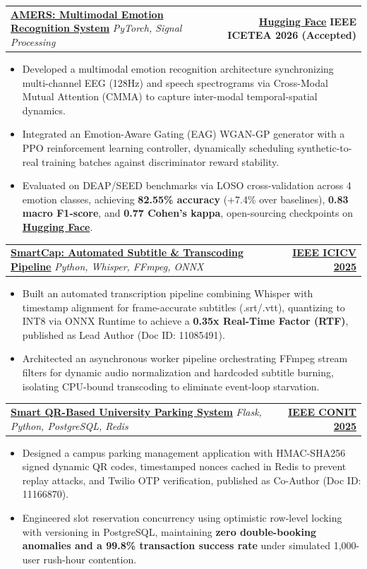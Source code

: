 \documentclass[letterpaper,10pt]{article}
\makeatletter
\newcommand{\resumeItem}[1]{
  \item\small{{\color{inkprimary}#1 \vspace{-1.5pt}}}
}
\newcommand{\resumeProjectHeading}[2]{
  \vspace{-3pt}\item
    \begin{tabular*}{\textwidth}{l@{\extracolsep{\fill}}r}
      \small\color{inkprimary}#1 & \small\color{inksecondary}#2 \\
    \end{tabular*}\vspace{-4.5pt}
}
\newcommand{\resumeItemListStart}{\begin{itemize}[leftmargin=0.14in, label={\color{inksecondary}\scriptsize$\bullet$}]}
\newcommand{\resumeItemListEnd}{\end{itemize}\vspace{-3.5pt}}
\makeatother
\begin{document}
    \resumeProjectHeading
      {\href{https://github.com/RAVINDRA8008/Adaptive-GAN-Augmented-EEG-Speech-Emotion-Recognition-via-Deep-Reinforcement-Learning}{\textbf{AMERS: Multimodal Emotion Recognition System}} \enspace\textbullet\enspace \emph{PyTorch, Signal Processing}}{\href{https://huggingface.co/r5avindra/amers-checkpoints}{\textbf{Hugging Face}} \enspace\textbullet\enspace \textbf{IEEE ICETEA 2026 (Accepted)}}
      \resumeItemListStart
        \resumeItem{Developed a multimodal emotion recognition architecture synchronizing multi-channel EEG (128Hz) and speech spectrograms via Cross-Modal Mutual Attention (CMMA) to capture inter-modal temporal-spatial dynamics.}
        \resumeItem{Integrated an Emotion-Aware Gating (EAG) WGAN-GP generator with a PPO reinforcement learning controller, dynamically scheduling synthetic-to-real training batches against discriminator reward stability.}
        \resumeItem{Evaluated on DEAP/SEED benchmarks via LOSO cross-validation across 4 emotion classes, achieving \textbf{82.55\% accuracy} (+7.4\% over baselines), \textbf{0.83 macro F1-score}, and \textbf{0.77 Cohen's kappa}, open-sourcing checkpoints on \href{https://huggingface.co/r5avindra/amers-checkpoints}{\textbf{Hugging Face}}.}
      \resumeItemListEnd

    \resumeProjectHeading
      {\href{https://github.com/RAVINDRA8008/SmartCap-Real-Time-Synchronized-Subtitles-for-Videos}{\textbf{SmartCap: Automated Subtitle \& Transcoding Pipeline}} \enspace\textbullet\enspace \emph{Python, Whisper, FFmpeg, ONNX}}{\href{https://ieeexplore.ieee.org/document/11085491}{\textbf{IEEE ICICV 2025}}}
      \resumeItemListStart
        \resumeItem{Built an automated transcription pipeline combining Whisper with timestamp alignment for frame-accurate subtitles (.srt/.vtt), quantizing to INT8 via ONNX Runtime to achieve a \textbf{0.35x Real-Time Factor (RTF)}, published as Lead Author (Doc ID: 11085491).}
        \resumeItem{Architected an asynchronous worker pipeline orchestrating FFmpeg stream filters for dynamic audio normalization and hardcoded subtitle burning, isolating CPU-bound transcoding to eliminate event-loop starvation.}
      \resumeItemListEnd

    \resumeProjectHeading
      {\href{https://github.com/RAVINDRA8008/Smart-QR-Based-Parking-System-main}{\textbf{Smart QR-Based University Parking System}} \enspace\textbullet\enspace \emph{Flask, Python, PostgreSQL, Redis}}{\href{https://ieeexplore.ieee.org/document/11166870}{\textbf{IEEE CONIT 2025}}}
      \resumeItemListStart
        \resumeItem{Designed a campus parking management application with HMAC-SHA256 signed dynamic QR codes, timestamped nonces cached in Redis to prevent replay attacks, and Twilio OTP verification, published as Co-Author (Doc ID: 11166870).}
        \resumeItem{Engineered slot reservation concurrency using optimistic row-level locking with versioning in PostgreSQL, maintaining \textbf{zero double-booking anomalies and a 99.8\% transaction success rate} under simulated 1,000-user rush-hour contention.}
      \resumeItemListEnd
\end{document}
